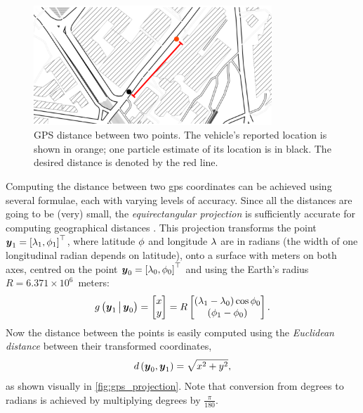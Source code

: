 \begin{knitrout}\small
{}\color{fgcolor}\begin{figure}

{\centering \includegraphics[width=0.8\textwidth]{figure/gps_dist-1} 

}

\caption[GPS distance between two points]{GPS distance between two points. The vehicle's reported location is shown in orange; one particle estimate of its location is in black. The desired distance is denoted by the red line.}\label{fig:gps_dist}
\end{figure}


\end{knitrout}

Computing the distance between two \gls{gps} coordinates can be achieved using several formulae, each with varying levels of accuracy. Since all the distances are going to be (very) small, the \emph{equirectangular projection} is sufficiently accurate for computing geographical distances \citep{Snyder_1998}. This projection transforms the point $\boldsymbol{y}_1 = \left[\lambda_1, \phi_1\right]^\top$, where latitude $\phi$ and longitude $\lambda$ are in radians (the width of one longitudinal radian depends on latitude), onto a surface with meters on both axes, centred on the point $\boldsymbol{y}_0 = \left[\lambda_0, \phi_0\right]^\top$ and using the Earth's radius \mbox{$R = 6.371 \times 10^6$}~meters:
\begin{equation}
\label{eq:equirectangular_projection}
g\left(\boldsymbol{y}_1\,\big|\,{}\boldsymbol{y}_0\right) =
\begin{bmatrix} x \\ y \end{bmatrix} =
R \begin{bmatrix}
(\lambda_1 - \lambda_0) \cos \phi_0 \\
(\phi_1 - \phi_0)
\end{bmatrix}.
\end{equation}
Now the distance between the points is easily computed using the \emph{Euclidean distance} between their transformed coordinates,
\begin{equation}
\label{eq:obs_dist}
d\left(\boldsymbol{y}_0, \boldsymbol{y}_1\right) = \sqrt{x^2 + y^2},
\end{equation}
as shown visually in \cref{fig:gps_projection}. Note that conversion from degrees to radians is achieved by multiplying degrees by $\frac{\pi}{180}$.

